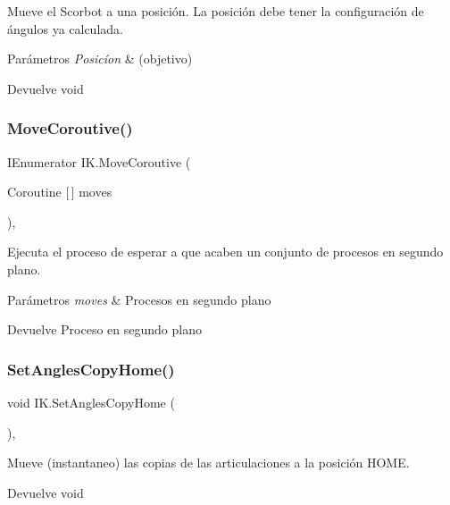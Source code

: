 Mueve el Scorbot a una posición. La posición debe tener la configuración de ángulos ya calculada. 
\begin{DoxyParams}{Parámetros}
{\em Posicíon} & (objetivo) \\
\hline
\end{DoxyParams}
\begin{DoxyReturn}{Devuelve}
void 
\end{DoxyReturn}
\mbox{\label{class_i_k_afc0847eff1049646f1c299debeccde27}} 
\subsubsection{\texorpdfstring{MoveCoroutive()}{MoveCoroutive()}}
{\footnotesize\ttfamily I\+Enumerator I\+K.\+Move\+Coroutive (\begin{DoxyParamCaption}\item[{Coroutine \mbox{[}$\,$\mbox{]}}]{moves }\end{DoxyParamCaption})\hspace{0.3cm}{\ttfamily [inline]}, {\ttfamily [private]}}

Ejecuta el proceso de esperar a que acaben un conjunto de procesos en segundo plano. 
\begin{DoxyParams}{Parámetros}
{\em moves} & Procesos en segundo plano \\
\hline
\end{DoxyParams}
\begin{DoxyReturn}{Devuelve}
Proceso en segundo plano 
\end{DoxyReturn}
\mbox{\label{class_i_k_a37830992ab0d16482aa1cd55f7f0fa38}} 
\subsubsection{\texorpdfstring{SetAnglesCopyHome()}{SetAnglesCopyHome()}}
{\footnotesize\ttfamily void I\+K.\+Set\+Angles\+Copy\+Home (\begin{DoxyParamCaption}{ }\end{DoxyParamCaption})\hspace{0.3cm}{\ttfamily [inline]}, {\ttfamily [private]}}

Mueve (instantaneo) las copias de las articulaciones a la posición H\+O\+ME. \begin{DoxyReturn}{Devuelve}
void 
\end{DoxyReturn}
\mbox{\label{class_i_k_a8b4370a0f1ee8b6b558c1f0b66997e01}} 
